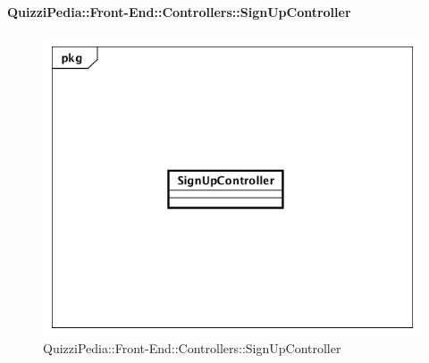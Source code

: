 \paragraph{QuizziPedia::Front-End::Controllers::SignUpController}
\begin{figure}
	\centering
	\includegraphics[scale=0.45]{UML/Classi/Front-End/QuizziPedia_Front-end_Controller_SignUpController.png}
	\caption{QuizziPedia::Front-End::Controllers::SignUpController}
\end{figure}

